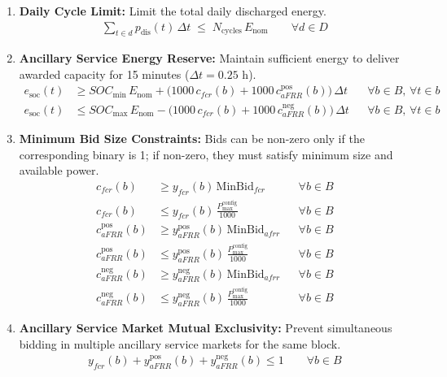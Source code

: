 \begin{enumerate}
  \item \textbf{Daily Cycle Limit:} Limit the total daily discharged energy.
  \begin{align}
    \sum_{t\in d} p_{\mathrm{dis}}(t)\,\Delta t \;\le\; N_{\mathrm{cycles}}\,E_{\mathrm{nom}}
    \qquad \forall d\in D
  \end{align}

  \item \textbf{Ancillary Service Energy Reserve:} Maintain sufficient energy to deliver awarded capacity for 15 minutes ($\Delta t=0.25$ h).
  \begin{align}
    e_{\mathrm{soc}}(t) &\ge SOC_{\min}\,E_{\mathrm{nom}} + \big(1000\,c_{fcr}(b) + 1000\,c^{\mathrm{pos}}_{aFRR}(b)\big)\,\Delta t
    && \forall b\in B,\, \forall t\in b \\
    e_{\mathrm{soc}}(t) &\le SOC_{\max}\,E_{\mathrm{nom}} - \big(1000\,c_{fcr}(b) + 1000\,c^{\mathrm{neg}}_{aFRR}(b)\big)\,\Delta t
    && \forall b\in B,\, \forall t\in b
  \end{align}

  \item \textbf{Minimum Bid Size Constraints:} Bids can be non-zero only if the corresponding binary is 1; if non-zero, they must satisfy minimum size and available power.
  \begin{align}
    c_{fcr}(b) &\ge y_{fcr}(b)\,\text{MinBid}_{fcr} && \forall b\in B \\
    c_{fcr}(b) &\le y_{fcr}(b)\,\frac{P^{\mathrm{config}}_{\max}}{1000} && \forall b\in B \\
    c^{\mathrm{pos}}_{aFRR}(b) &\ge y^{\mathrm{pos}}_{aFRR}(b)\,\text{MinBid}_{afrr} && \forall b\in B \\
    c^{\mathrm{pos}}_{aFRR}(b) &\le y^{\mathrm{pos}}_{aFRR}(b)\,\frac{P^{\mathrm{config}}_{\max}}{1000} && \forall b\in B \\
    c^{\mathrm{neg}}_{aFRR}(b) &\ge y^{\mathrm{neg}}_{aFRR}(b)\,\text{MinBid}_{afrr} && \forall b\in B \\
    c^{\mathrm{neg}}_{aFRR}(b) &\le y^{\mathrm{neg}}_{aFRR}(b)\,\frac{P^{\mathrm{config}}_{\max}}{1000} && \forall b\in B
  \end{align}

  \item \textbf{Ancillary Service Market Mutual Exclusivity:} Prevent simultaneous bidding in multiple ancillary service markets for the same block.
  \begin{align}
    y_{fcr}(b) + y^{\mathrm{pos}}_{aFRR}(b) + y^{\mathrm{neg}}_{aFRR}(b) \le 1 \qquad \forall b\in B
  \end{align}
\end{enumerate}

